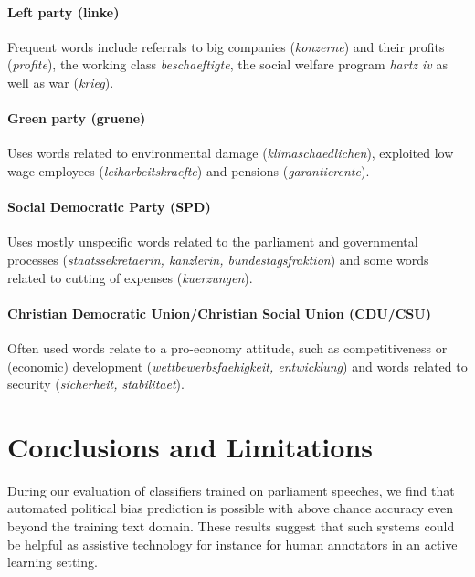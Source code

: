\documentclass[11pt]{article}
\begin{document}
\paragraph{\bf Left party (linke)} Frequent words include referrals to big companies ({\em konzerne}) and their profits ({\em profite}), the working class {\em beschaeftigte}, the social welfare program {\em hartz iv} as well as war ({\em krieg}).
\paragraph{\bf Green party (gruene)} Uses words related to environmental damage ({\em klimaschaedlichen}), exploited low wage employees ({\em leiharbeitskraefte}) and pensions ({\em garantierente}).
\paragraph{\bf Social Democratic Party (SPD)} Uses mostly unspecific words related to the parliament and governmental processes ({\em staatssekretaerin, kanzlerin, bundestagsfraktion}) and some words related to cutting of expenses ({\em kuerzungen}).
\paragraph{\bf Christian Democratic Union/Christian Social Union (CDU/CSU)}
Often used words relate to a pro-economy attitude, such as competitiveness or (economic) development ({\em wettbewerbsfaehigkeit, entwicklung}) and words related to security ({\em sicherheit, stabilitaet}). 

\section{Conclusions and Limitations}\label{sec:conclusion}
During our evaluation of classifiers trained on parliament speeches, we find that automated political bias prediction is possible with above chance accuracy even beyond the training text domain. These results suggest that such systems could be helpful as assistive technology for instance for human annotators in an active learning setting. 
\end{document}
